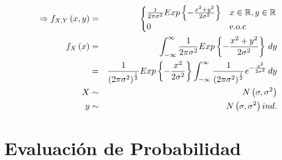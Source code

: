 \begin{enumerate}
\begin{enumerate}
\begin{eqnarray*}
  \Rightarrow f_{X,Y} \left( x,y \right) &=& \begin{cases}
  \frac{1}{2\pi \sigma^2 } Exp \left\{ - \frac{x^2+y^2}{2\sigma^ 2} \right\} & x\in \mathbb{R}, y \in \mathbb{R}\\
  0 & \textrm{e.o.c}
  \end{cases}\\
  f_{X} \left(x \right) &=& \int_{-\infty}^{\infty} \frac{1}{2\pi \sigma^2} Exp \left\{ - \frac{x^2+y^2}{2\sigma^ 2} \right\} \,dy\\
  &=&  \frac{1}{\left(2\pi \sigma^2 \right)^{ \frac{1}{2} } }  Exp \left\{ - \frac{x^2}{2\sigma^ 2}\right\} \int_{- \infty}^{\infty} \frac{1}{  \left( 2\pi \sigma^2 \right)^{ \frac{1}{2} } } e^{- \frac{y^2}{2\sigma^2} } \, dy\\
  X &\sim& N \left( \sigma, \sigma^2\right)\\
  y &\sim& N \left( \sigma, \sigma^2 \right) ind.
\end{eqnarray*}
\end{enumerate}
\end{enumerate}

\section{ Evaluaci\'on de Probabilidad }


